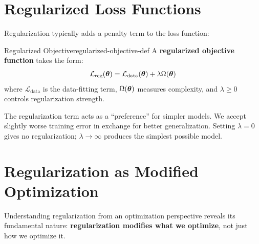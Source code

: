 \documentclass[../../main.tex]{subfiles}
\begin{document}
\section{Regularized Loss Functions}
\label{sec:regularized-loss}

Regularization typically adds a penalty term to the loss function:

\begin{definition}{Regularized Objective}{regularized-objective-def}
A \textbf{regularized objective function} takes the form:
\[
    \mathcal{L}_{\text{reg}}(\boldsymbol{\theta}) = \mathcal{L}_{\text{data}}(\boldsymbol{\theta}) + \lambda \Omega(\boldsymbol{\theta})
\]
where $\mathcal{L}_{\text{data}}$ is the data-fitting term, $\Omega(\boldsymbol{\theta})$ measures complexity, and $\lambda \geq 0$ controls regularization strength.
\end{definition}

\begin{intuition}
The regularization term acts as a ``preference'' for simpler models. We accept slightly worse training error in exchange for better generalization. Setting $\lambda = 0$ gives no regularization; $\lambda \to \infty$ produces the simplest possible model.
\end{intuition}

\section{Regularization as Modified Optimization}
\label{sec:regularization-optimization}

Understanding regularization from an optimization perspective reveals its fundamental nature: \textbf{regularization modifies what we optimize}, not just how we optimize it.
\end{document}
